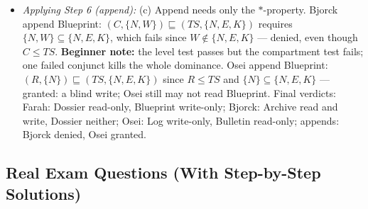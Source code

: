 \documentclass[12pt, a4paper]{article}
\begin{document}
\begin{itemize}
    \item \textit{Applying Step 6 (append):} (c) Append needs only the $*$-property. Bjorck append Blueprint: $(C, \{N,W\}) \sqsubseteq (TS, \{N,E,K\})$ requires $\{N,W\} \subseteq \{N,E,K\}$, which fails since $W \notin \{N,E,K\}$ --- denied, even though $C \leq TS$. \textbf{Beginner note:} the level test passes but the compartment test fails; one failed conjunct kills the whole dominance. Osei append Blueprint: $(R, \{N\}) \sqsubseteq (TS, \{N,E,K\})$ since $R \leq TS$ and $\{N\} \subseteq \{N,E,K\}$ --- granted: a blind write; Osei still may not read Blueprint. Final verdicts: Farah: Dossier read-only, Blueprint write-only; Bjorck: Archive read and write, Dossier neither; Osei: Log write-only, Bulletin read-only; appends: Bjorck denied, Osei granted.
\end{itemize}

\subsection*{Real Exam Questions (With Step-by-Step Solutions)}
\end{document}
